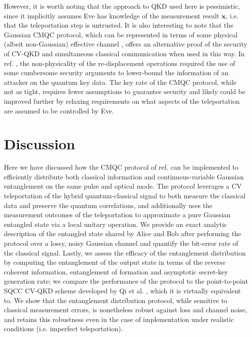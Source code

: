 \documentclass[%
 reprint,
 superscriptaddress,
 amsmath,
 amssymb,
 aps,
 pra,
]{revtex4-2}
\begin{document}
However, it is worth noting that the approach to QKD used here is pessimistic, since it implicitly assumes Eve has knowledge of the measurement result $\bm x$, i.e. that the teleportation step is untrusted. It is also interesting to note that the Gaussian CMQC protocol, which can be represented in terms of some physical (albeit non-Gaussian) effective channel \cite{zaunders_generalised_2026}, offers an alternative proof of the security of CV-QKD and simultaneous classical communication when used in this way. In ref. \cite{zaunders_enhanced_2025}, the non-physicality of the re-displacement operations required the use of some cumbersome security arguments to lower-bound the information of an attacker on the quantum key data. The key rate of the CMQC protocol, while not as tight, requires fewer assumptions to guarantee security and likely could be improved further by relaxing requirements on what aspects of the teleportation are assumed to be controlled by Eve.

\section{Discussion} \label{sec:discussion}
Here we have discussed how the CMQC protocol of ref. \cite{zaunders_generalised_2026} can be implemented to efficiently distribute both classical information and continuous-variable Gaussian entanglement on the same pulse and optical mode. The protocol leverages a CV teleportation of the hybrid quantum-classical signal to both measure the classical data and preserve the quantum correlations, and additionally uses the measurement outcomes of the teleportation to approximate a pure Gaussian entangled state via a local unitary operation. We provide an exact analytic description of the entangled state shared by Alice and Bob after performing the protocol over a lossy, noisy Gaussian channel and quantify the bit-error rate of the classical signal. Lastly, we assess the efficacy of the entanglement distribution by computing the entanglement of the output state in terms of the reverse coherent information, entanglement of formation and asymptotic secret-key generation rate; we compare the performance of the protocol to the point-to-point SQCC CV-QKD scheme developed by Qi et al. \cite{qi_simultaneous_2016, zaunders_enhanced_2025}, which it is virtually equivalent to. We show that the entanglement distribution protocol, while sensitive to classical measurement errors, is nonetheless robust against loss and channel noise, and retains this robustness even in the case of implementation under realistic conditions (i.e. imperfect teleportation). 
\end{document}
